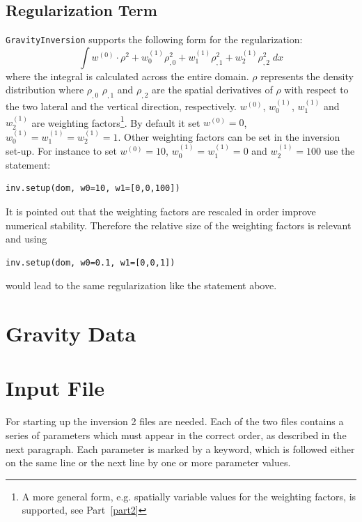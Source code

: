 \subsection{Regularization Term}\label{SEC:P1:GRAV:REMARK:REG}
\verb|GravityInversion| supports the following form for the regularization:
\begin{equation}
\int w^{(0)} \cdot \rho^2 + w^{(1)}_0  \rho_{,0}^2 +  w^{(1)}_1  \rho_{,1}^2 +  w^{(1)}_2  \rho_{,2}^2\; dx   
\end{equation}
where the integral is calculated across the entire domain. $\rho$ represents the density distribution 
where $\rho_{,0}$ $\rho_{,1}$ and $\rho_{,2}$ are the spatial derivatives of $\rho$ with respect to the 
two lateral and the vertical direction, respectively.  
$w^{(0)}$, $w^{(1)}_0$, $w^{(1)}_1$ and $w^{(1)}_2$ are weighting factors\footnote{A more general form, e.g. spatially variable values
for the weighting factors, is supported, see Part~\ref{part2}}. By default it set
$w^{(0)}=0$, $w^{(1)}_0=w^{(1)}_1=w^{(1)}_2=1$. Other weighting factors can be set in the inversion set-up. For instance to
set $w^{(0)}=10$,
$w^{(1)}_0=w^{(1)}_1=0$ and $w^{(1)}_2=100$ use the statement:
\begin{verbatim}
inv.setup(dom, w0=10, w1=[0,0,100])
\end{verbatim}
It is pointed out that the weighting factors are rescaled in order improve numerical stability. Therefore the relative size of
the weighting factors is relevant and using  
\begin{verbatim}
inv.setup(dom, w0=0.1, w1=[0,0,1])
\end{verbatim}
would lead to the same regularization like the statement above.










\section{Gravity Data}





\section{Input File} 

For starting up the inversion 2 files are needed. Each of the 
two files contains a series of parameters which must appear in the correct order, as described in 
the next paragraph. Each parameter is marked by a keyword, which is followed either on the same line 
or the next line by one or more parameter values. 

